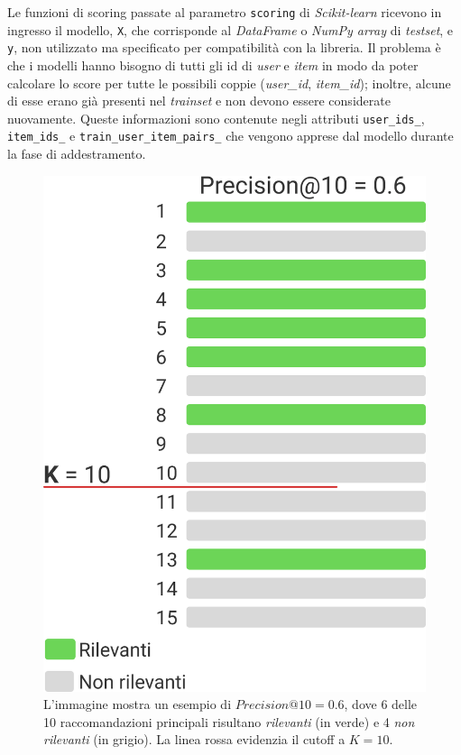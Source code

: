 Le funzioni di scoring passate al parametro \texttt{scoring} di \textit{Scikit-learn} ricevono in ingresso il modello, \texttt{X}, che corrisponde al \textit{DataFrame} o \textit{NumPy array} di \textit{testset}, e \texttt{y}, non utilizzato ma specificato per compatibilità con la libreria. Il problema è che i modelli hanno bisogno di tutti gli id di \textit{user} e \textit{item} in modo da poter calcolare lo score per tutte le possibili coppie (\textit{user\_id}, \textit{item\_id}); inoltre, alcune di esse erano già presenti nel \textit{trainset} e non devono essere considerate nuovamente. Queste informazioni sono contenute negli attributi \texttt{user\_ids\_}, \texttt{item\_ids\_} e \texttt{train\_user\_item\_pairs\_} che vengono apprese dal modello durante la fase di addestramento.


\begin{figure}[H]
    \centering
    \includegraphics[scale=0.7]{figures/algorithms/precision_@_k.png}
    \caption{L'immagine mostra un esempio di $Precision@10 = 0{.}6$, dove 6 delle 10 raccomandazioni principali risultano \textit{rilevanti} (in verde) e 4 \textit{non rilevanti} (in grigio). La linea rossa evidenzia il cutoff a $K = 10$.}
\end{figure}

